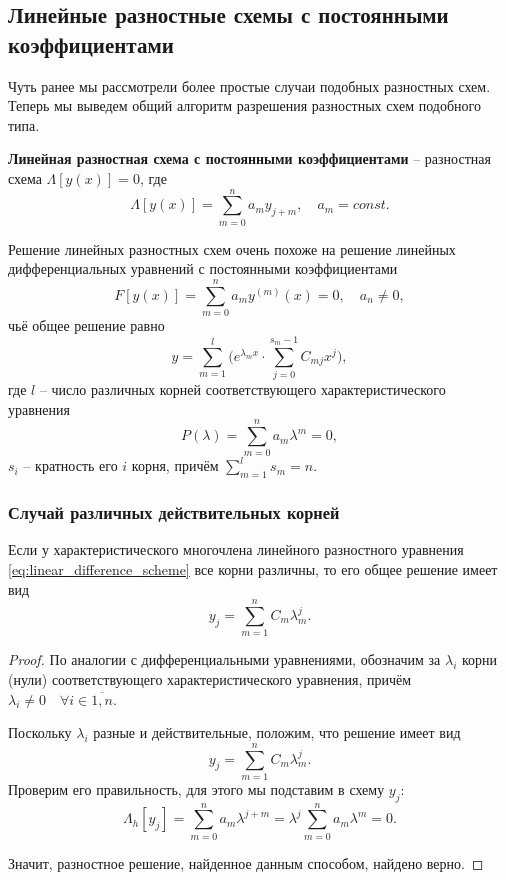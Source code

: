 \documentclass[../main.tex]{subfile}
\begin{document}
\subsection{Линейные разностные схемы с постоянными коэффициентами}
Чуть ранее мы рассмотрели более простые случаи подобных разностных схем. Теперь
мы выведем общий алгоритм разрешения разностных схем подобного типа.

\begin{define}\label{eq:linear_difference_scheme}
	\textbf{Линейная разностная схема с постоянными коэффициентами} --
	разностная схема $\Lambda[y(x)]=0$, где
	\[\Lambda[y(x)]=\sum_{m=0}^{n}a_my_{j+m},\quad a_m=const.\]
\end{define}

Решение линейных разностных схем очень похоже на решение линейных
дифференциальных уравнений с постоянными коэффициентами
\[F[y(x)]=\sum_{m=0}^{n}a_my^{(m)}(x)=0,\quad a_n\ne 0,\]
чьё общее решение равно
\[y=\sum_{m=1}^{l}\Big(e^{\lambda_mx}\cdot\sum_{j=0}^{s_m-1}C_{mj}x^j\Big),\]
где $l$ -- число различных корней соответствующего характеристического уравнения
\[P(\lambda)=\sum_{m=0}^{n}a_m\lambda^m=0,\]
$s_i$ -- кратность его $i$ корня, причём $\sum_{m=1}^{l}s_m=n$.

\subsubsection{Случай различных действительных корней}
\begin{theorem}
	Если у характеристического многочлена линейного разностного уравнения
	\eqref{eq:linear_difference_scheme} все корни различны, то его общее
	решение имеет вид
	\[\boxed{y_j=\sum_{m=1}^{n}C_m\lambda_m^j}.\]
\end{theorem}

\begin{proof}
	По аналогии с дифференциальными уравнениями, обозначим за $\lambda_i$
	корни (нули) соответствующего характеристического уравнения, причём
	$\lambda_i\ne 0\quad\forall i\in\overline{1,n}$.

	Поскольку $\lambda_i$ разные и действительные, положим, что решение
	имеет вид
	\[y_j=\sum_{m=1}^{n}C_m\lambda_m^j.\]
	Проверим его правильность, для этого мы подставим в схему $y_j$:
	\[\Lambda_h[y_j]=\sum_{m=0}^{n}a_m\lambda^ {j+m}=\lambda^j\sum_{m=0}^
	{n}a_m\lambda^m=0.\]

	Значит, разностное решение, найденное данным способом, найдено верно.
\end{proof}
\end{document}
